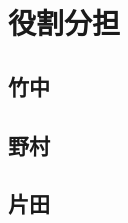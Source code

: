 \documentclass[report.tex]{subfiles}
\begin{document}
\section{役割分担}

\subsection{竹中}

\subsection{野村}

\subsection{片田}
\end{document}

